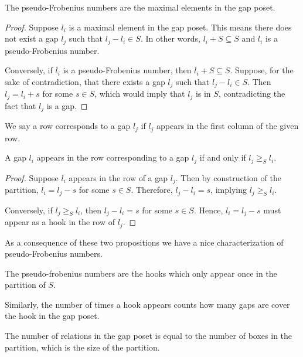 \documentclass[11pt]{article}
\begin{document}
\begin{proposition}
The pseudo-Frobenius numbers are the maximal elements in the gap poset.
\end{proposition}

\begin{proof}
    Suppose \( l_i \) is a maximal element in the gap poset. This means there does not exist a gap \( l_j \) such that \( l_j - l_i \in S \). In other words, \( l_i + S \subseteq S \) and \( l_i \) is a pseudo-Frobenius number.
    
    Conversely, if \( l_i \) is a pseudo-Frobenius number, then \( l_i + S \subseteq S \). Suppose, for the sake of contradiction, that there exists a gap \( l_j \) such that \( l_j - l_i \in S \). Then \( l_j = l_i + s \) for some \( s \in S \), which would imply that \( l_j \) is in \( S \), contradicting the fact that \( l_j \) is a gap.
\end{proof}


We say a row corresponds to a gap \(l_j\) if \(l_j\) appears in the first column of the given row. 

\begin{proposition}
A gap \( l_i \) appears in the row corresponding to a gap \( l_j \) if and only if \( l_j \ge_S l_i \).
\end{proposition}

\begin{proof}
Suppose \( l_i \) appears in the row of a gap \( l_j \). Then by construction of the partition, \( l_i = l_j - s \) for some \( s \in S \). Therefore, \( l_j - l_i = s \), implying \( l_j \ge_S l_i \).

Conversely, if \( l_j \ge_S l_i \), then \( l_j - l_i = s \) for some \( s \in S \). Hence, \( l_i = l_j - s \) must appear as a hook in the row of \( l_j \).
\end{proof}


As a consequence of these two propositions we have a nice characterization of pseudo-Frobenius numbers.

\begin{corollary}
    The pseudo-frobenius numbers are the hooks which only appear once in the partition of \(S\).
\end{corollary}

Similarly, the number of times a hook appears counts how many gaps are cover the hook in the gap poset.

\begin{corollary}
The number of relations in the gap poset is equal to the number of boxes in the partition, which is the size of the partition.
\end{corollary}
\end{document}
